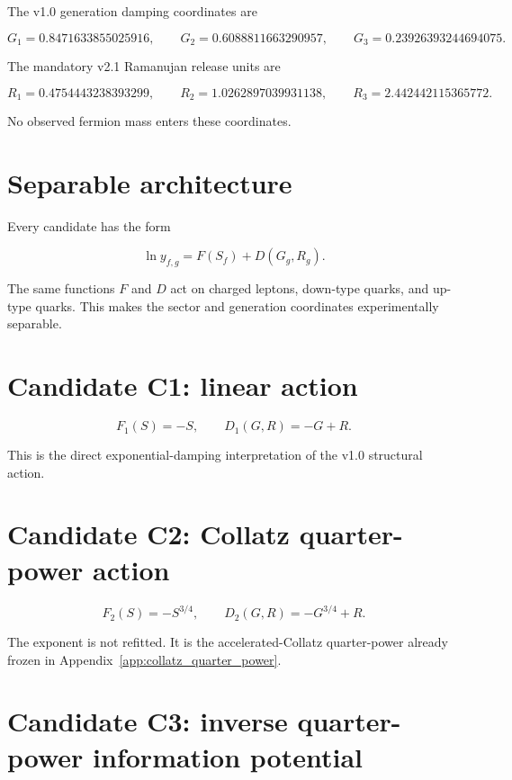 The v1.0 generation damping coordinates are

\[
G_1=0.8471633855025916,
\qquad
G_2=0.6088811663290957,
\qquad
G_3=0.23926393244694075.
\]

The mandatory v2.1 Ramanujan release units are

\[
R_1=0.4754443238393299,
\qquad
R_2=1.0262897039931138,
\qquad
R_3=2.442442115365772.
\]

No observed fermion mass enters these coordinates.

\section{Separable architecture}

Every candidate has the form

\begin{equation}
\ln y_{f,g}=F(S_f)+D(G_g,R_g).
\label{eq:v107_separable_architecture}
\end{equation}

The same functions $F$ and $D$ act on charged leptons, down-type quarks, and
up-type quarks.  This makes the sector and generation coordinates
experimentally separable.

\section{Candidate C1: linear action}

\begin{equation}
F_1(S)=-S,
\qquad
D_1(G,R)=-G+R.
\label{eq:v107_candidate_c1}
\end{equation}

This is the direct exponential-damping interpretation of the v1.0 structural
action.

\section{Candidate C2: Collatz quarter-power action}

\begin{equation}
F_2(S)=-S^{3/4},
\qquad
D_2(G,R)=-G^{3/4}+R.
\label{eq:v107_candidate_c2}
\end{equation}

The exponent is not refitted.  It is the accelerated-Collatz quarter-power
already frozen in Appendix~\ref{app:collatz_quarter_power}.

\section{Candidate C3: inverse quarter-power information potential}

